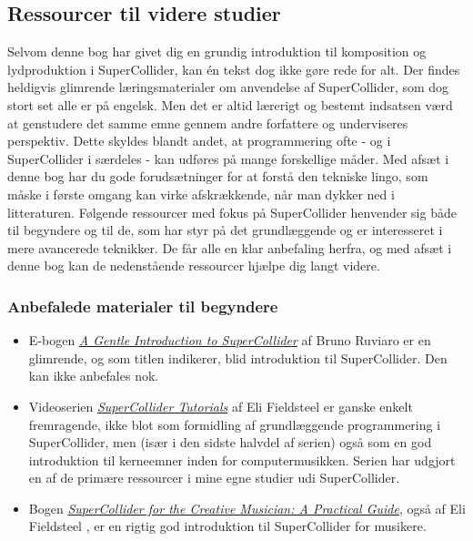 \subsection{Ressourcer til videre studier}

Selvom denne bog har givet dig en grundig introduktion til komposition og lydproduktion i SuperCollider, kan én tekst dog ikke gøre rede for alt. Der findes heldigvis glimrende læringsmaterialer om anvendelse af SuperCollider, som dog stort set alle er på engelsk. Men det er altid lærerigt og bestemt indsatsen værd at genstudere det samme emne gennem andre forfattere og underviseres perspektiv. Dette skyldes blandt andet, at programmering ofte - og i SuperCollider i særdeles - kan udføres på mange forskellige måder. Med afsæt i denne bog har du gode forudsætninger for at forstå den tekniske lingo, som måske i første omgang kan virke afskrækkende, når man dykker ned i litteraturen. Følgende ressourcer med fokus på SuperCollider henvender sig både til begyndere og til de, som har styr på det grundlæggende og er interesseret i mere avancerede teknikker. De får alle en klar anbefaling herfra, og med afsæt i denne bog kan de nedenstående ressourcer hjælpe dig langt videre.
\subsubsection{Anbefalede materialer til begyndere}

\begin{itemize}
\item E-bogen \href{https://ccrma.stanford.edu/~ruviaro/texts/A\_Gentle\_Introduction\_To\_SuperCollider.pdf}{\textit{A Gentle Introduction to SuperCollider}} af Bruno Ruviaro \parencite*{ruviaro2015} er en glimrende, og som titlen indikerer, blid introduktion til SuperCollider. Den kan ikke anbefales nok.
\item Videoserien \href{https://www.youtube.com/playlist?list=PLPYzvS8A\_rTaNDweXe6PX4CXSGq4iEWYC}{\textit{SuperCollider Tutorials}} af Eli Fieldsteel \parencite*{fieldsteel2024} er ganske enkelt fremragende, ikke blot som formidling af grundlæggende programmering i SuperCollider, men (især i den sidste halvdel af serien) også som en god introduktion til kerneemner inden for computermusikken. Serien har udgjort en af de primære ressourcer i mine egne studier udi SuperCollider.
\item Bogen \href{https://academic.oup.com/book/55790}{\textit{SuperCollider for the Creative Musician: A Practical Guide}}, også af Eli Fieldsteel \parencite*{fieldsteel2024a}, er en rigtig god introduktion til SuperCollider for musikere. 
\end{itemize}
